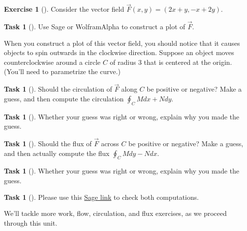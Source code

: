 \documentclass[10pt,]{book}
\theoremstyle{plain}
\theoremstyle{definition}
\theoremstyle{definition}
\theoremstyle{definition}
\theoremstyle{definition}
\newtheorem{exploration}[project]{Exercise}
\newtheorem{task}[project]{Task}
\theoremstyle{definition}
\numberwithin{equation}{section}
\newcommand{\sageworkfluxurl}{http://bmw.byuimath.com/dokuwiki/doku.php?id=both_flux_and_work}
\begin{document}
\begin{exploration}[]\label{exploration-196}
Consider the vector field \(\vec F(x,y) = (2x+y,-x+2y)\).%
\begin{task}[]\label{task-494}
Use Sage or WolframAlpha to construct a plot of \(\vec F\).%
\end{task}
When you construct a plot of this vector field, you should notice that it causes objects to spin outwards in the clockwise direction. Suppose an object moves counterclockwise around a circle \(C\) of radius 3 that is centered at the origin. (You'll need to parametrize the curve.)%
\begin{task}[]\label{task-495}
Should the circulation of \(\vec F\) along \(C\) be positive or negative?  Make a guess, and then compute the circulation \(\oint_C Mdx+Ndy\).%
\end{task}
\begin{task}[]\label{task-496}
Whether your guess was right or wrong, explain why you made the guess.%
\end{task}
\begin{task}[]\label{task-497}
Should the flux of \(\vec F\) across \(C\) be positive or negative? Make a guess, and then actually compute the flux \(\oint_C Mdy-Ndx\).%
\end{task}
\begin{task}[]\label{task-498}
Whether your guess was right or wrong, explain why you made the guess.%
\end{task}
\begin{task}[]\label{task-499}
Please use this \href{\\sageworkfluxurl}{Sage link} to check both computations.%
\end{task}
\end{exploration}
We'll tackle more work, flow, circulation, and flux exercises, as we proceed through this unit.%
\typeout{************************************************}
\typeout{************************************************}
\end{document}
